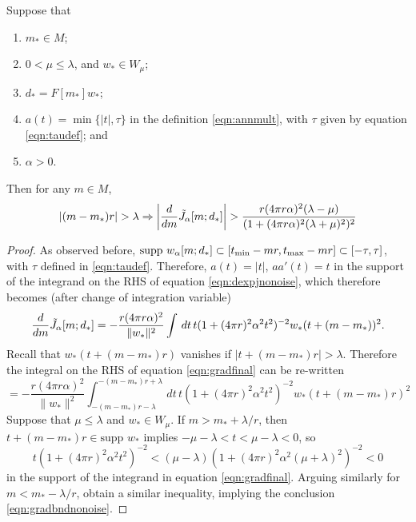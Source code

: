 \begin{proposition}
  \label{thm:rampgood}
  Suppose that
  \begin{enumerate}
  \item $m_* \in M$;
  \item $0 < \mu \le \lambda$, and $w_* \in W_{\mu}$;
  \item $d_* = F[m_*]w_*$;
  \item $a(t)=\min\{|t|,\tau\}$ in the definition \ref{eqn:annmult},
    with $\tau$ given by equation \ref{eqn:taudef}; and
  \item $\alpha > 0$.
  \end{enumerate}
  Then for any $m \in M$, 
  \begin{equation}
    | (m - m_*)r| > \lambda  \Rightarrow  \left|\frac{d}{dm}\tilde{J}_{\alpha}[m;d_*]\right| >  
    \frac{r(4 \pi r \alpha)^2(\lambda-\mu)}{(1+(4\pi r\alpha)^2 
      (\lambda+\mu)^2)^{2}}  
    \label{eqn:gradbndnonoise}
  \end{equation}
\end{proposition}
\begin{proof}
  As observed before, $\mbox{supp }w_{\alpha}[m;d_*] \subset [t_{\rm
    min}-mr,t_{\rm max}-mr]\subset [-\tau,\tau]$, with $\tau$ defined
  in \ref{eqn:taudef}. Therefore, $a(t) = |t|$, $a a'(t) = t$ in the
  support of the integrand on the RHS of equation
  \ref{eqn:dexpjnonoise}, which therefore 
  becomes (after change of integration variable)
  \begin{equation}
    \label{eqn:gradfinal}
    \frac{d}{dm}\tilde{J}_{\alpha}[m;d_*] = -\frac{r (4\pi r\alpha)^2}{\|w_*\|^2} \int \,dt \, 
  t(1+(4\pi r)^2 \alpha^2 
  t^2)^{-2}w_*(t+(m-m_*))^2.
  \end{equation}
  Recall that $w_*(t+(m-m_*)r)$
  vanishes if $|t+(m-m_*)r| > \lambda$. Therefore the integral on the
  RHS of equation \ref{eqn:gradfinal} can be re-written
  \[
    = -\frac{r(4 \pi r \alpha)^2}{\|w_*\|^2}\int_{-(m-m_*)r-\lambda}^{-(m-m_*)r+\lambda}
    \,dt\, t(1+(4\pi r)^2\alpha^2 t^2)^{-2}w_*\left(t+(m-m_*)r\right)^2
  \]
  Suppose that $\mu \le \lambda$ and $w_* \in W_{\mu}$. 
  If $m > m_*+\lambda/r$, then $t+(m-m_*)r \in \mbox{supp }w_*$
  implies $-\mu - \lambda < t < \mu-\lambda<0$, so 
  \[
    t(1+(4\pi r)^2\alpha^2 t^2)^{-2} < (\mu-\lambda)(1+(4\pi r)^2\alpha^2 (\mu+\lambda)^2)^{-2}<0
  \]
  in the support of the integrand in equation
  \ref{eqn:gradfinal}. Arguing similarly for $m<m_*-\lambda/r$, obtain
  a similar inequality, implying the conclusion \ref{eqn:gradbndnonoise}.
\end{proof}

